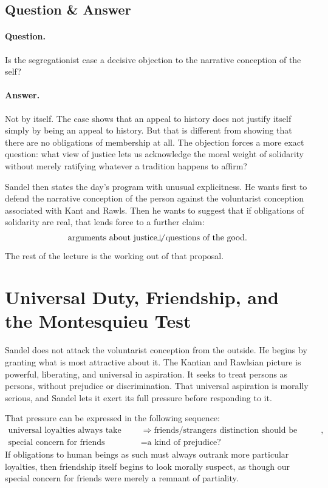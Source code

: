 \subsection{Question \& Answer}

\paragraph{Question.} Is the segregationist case a decisive objection to the narrative conception of the self?

\paragraph{Answer.} Not by itself. The case shows that an appeal to history does not justify itself simply by being an appeal to history. But that is different from showing that there are no obligations of membership at all. The objection forces a more exact question: what view of justice lets us acknowledge the moral weight of solidarity without merely ratifying whatever a tradition happens to affirm?

Sandel then states the day's program with unusual explicitness. He wants first to defend the narrative conception of the person against the voluntarist conception associated with Kant and Rawls. Then he wants to suggest that if obligations of solidarity are real, that lends force to a further claim:
\begin{equation}
\text{arguments about justice}
\not\!\!\perp
\text{questions of the good}.
\end{equation}
The rest of the lecture is the working out of that proposal.

\section{Universal Duty, Friendship, and the Montesquieu Test}

Sandel does not attack the voluntarist conception from the outside. He begins by granting what is most attractive about it. The Kantian and Rawlsian picture is powerful, liberating, and universal in aspiration. It seeks to treat persons as persons, without prejudice or discrimination. That universal aspiration is morally serious, and Sandel lets it exert its full pressure before responding to it.

That pressure can be expressed in the following sequence:
\begin{align}
\text{universal loyalties always take precedence}
&\Longrightarrow
\text{friends/strangers distinction should be overcome},\\
\text{special concern for friends}
&=
\text{a kind of prejudice?}
\end{align}
If obligations to human beings as such must always outrank more particular loyalties, then friendship itself begins to look morally suspect, as though our special concern for friends were merely a remnant of partiality.

